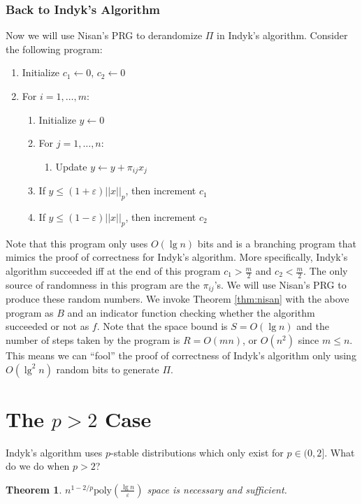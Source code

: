 \documentclass[11pt]{article}
\newtheorem{theorem}{Theorem}
\newcommand{\eps}{\varepsilon}
\begin{document}
\subsubsection{Back to Indyk's Algorithm}
Now we will use Nisan's PRG to derandomize $\Pi$ in Indyk's algorithm. Consider the following program:

\begin{enumerate}
\item Initialize $c_1 \leftarrow 0$, $c_2 \leftarrow 0$
\item For $i=1,\dots,m$:
\begin{enumerate}
\item Initialize $y \leftarrow 0$
\item For $j=1,\dots,n$:
\begin{enumerate}
\item Update $y \leftarrow y + \pi_{ij} x_j $
\end{enumerate}
\item If $y \le (1+\eps) ||x||_p$, then increment $c_1$
\item If $y \le (1-\eps) ||x||_p$, then increment $c_2$
\end{enumerate}

\end{enumerate}

Note that this program only uses $O(\lg n)$ bits and is a branching program that mimics the proof of correctness for Indyk's algorithm. More specifically, Indyk's algorithm succeeded iff at the end of this program $c_1 > \frac{m}{2}$ and $c_2 < \frac{m}{2}$. The only source of randomness in this program are the $\pi_{ij}$'s. We will use Nisan's PRG to produce these random numbers. We invoke Theorem \ref{thm:nisan} with the above program as $B$ and an indicator function checking whether the algorithm succeeded or not as $f$. Note that the space bound is $S=O(\lg n)$ and the number of steps taken by the program is $R=O(mn)$, or $O(n^2)$ since $m\le n$. This means we can ``fool'' the proof of correctness of Indyk's algorithm only using $O(\lg^2 n)$ random bits to generate $\Pi$. 

\section{The $p>2$ Case}

Indyk's algorithm uses $p$-stable distributions which only exist for $p\in (0,2]$. What do we do when $p>2$?

\begin{theorem}
$n^{1-2/p}\text{poly}(\frac{\lg n}{\eps})$ space is necessary and
sufficient.
\end{theorem}
\end{document}
